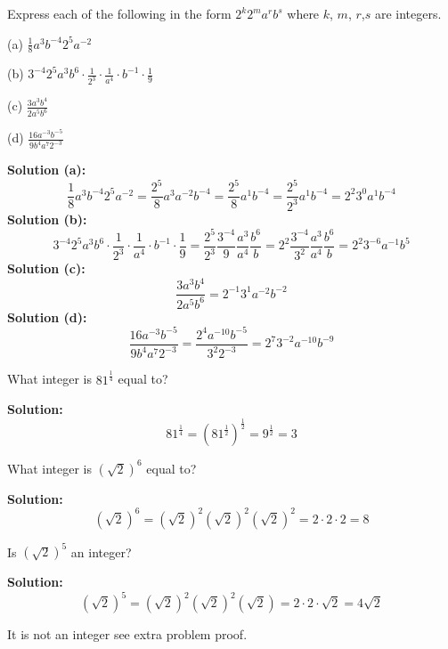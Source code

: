 \documentclass[6pt]{article}
\begin{document}
\begin{tcolorbox}[title=Problem 1, breakable]
    Express each of the following in the form 
    $2^k 2^m a^r b^s$ where $k$, $m$, $r$,$s$
    are integers.

    (a) $\frac{1}{8} a^3 b^{-4} 2^5 a^{-2}$

    (b) $3^{-4} 2^5 a^3 b^6 \cdot \frac{1}{2^3} \cdot \frac{1}{a^4} \cdot b^{-1} \cdot \frac{1}{9}$

    (c) $\frac{3a^3b^4}{2a^5b^6}$

    (d) $\frac{16a^{-3}b^{-5}}{9b^4 a^7 2^{-3}}$
\end{tcolorbox}

\textbf{Solution (a):}
\[\frac{1}{8} a^3 b^{-4} 2^5 a^{-2} 
    = \frac{2^5}{8} a^3 a^{-2} b^{-4}
    = \frac{2^5}{8} a^1 b^{-4}
    = \frac{2^5}{2^3} a^1 b^{-4}
    = 2^2 3^0 a^1 b^{-4}\]
\textbf{Solution (b):}
\[3^{-4} 2^5 a^3 b^6 \cdot \frac{1}{2^3} \cdot \frac{1}{a^4} \cdot b^{-1} \cdot \frac{1}{9}
    = \frac{2^5}{2^3} \frac{3^{-4}}{9} \frac{a^3}{a^4} \frac{b^6}{b}
    = 2^2 \frac{3^{-4}}{3^2} \frac{a^3}{a^4} \frac{b^6}{b}
    = 2^2 3^{-6} a^{-1} b^5\]
\textbf{Solution (c):}
\[\frac{3 a^3 b^4}{2 a^5 b^6}
    = 2^{-1} 3^1 a^{-2} b^{-2}\]
\textbf{Solution (d):}
\[\frac{16 a^{-3} b^{-5}}{9 b^4 a^7 2^{-3}}
    = \frac{2^4 a^{-10} b^{-5}}{3^2 2^{-3}}
    = 2^7 3^{-2} a^{-10} b^{-9}\]

\begin{tcolorbox}[title=Problem 2, breakable]
    What integer is $81^{\frac{1}{4}}$ equal to?
\end{tcolorbox}

\textbf{Solution:}
\[81^{\frac{1}{4}} = (81^{\frac{1}{2}})^{\frac{1}{2}} = 9^{\frac{1}{2}} = 3\]

\begin{tcolorbox}[title=Problem 3, breakable]
    What integer is $(\sqrt{2})^6$ equal to?
\end{tcolorbox}

\textbf{Solution:}
\[(\sqrt{2})^6 = (\sqrt{2})^2 (\sqrt{2})^2 (\sqrt{2})^2 = 2 \cdot 2 \cdot 2 = 8\]

\begin{tcolorbox}[title=Problem 4, breakable]
    Is $(\sqrt{2})^5$ an integer?
\end{tcolorbox}

\textbf{Solution:}
\[(\sqrt{2})^5 = (\sqrt{2})^2 (\sqrt{2})^2 (\sqrt{2}) = 2 \cdot 2 \cdot \sqrt{2} = 4 \sqrt{2}\]

It is not an integer see extra problem proof.
\end{document}
